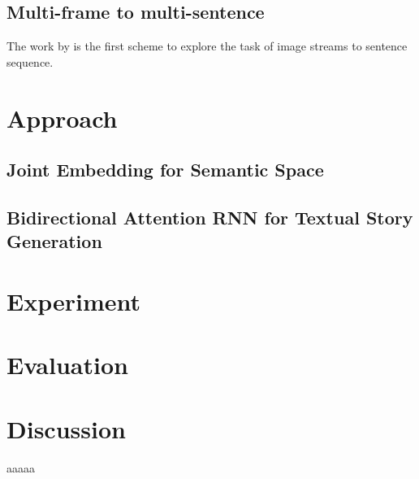 \documentclass[11pt]{article}
\begin{document}
		
		\subsection{Multi-frame to multi-sentence}
		The work by is the first scheme to explore the task of image streams to sentence sequence.		
		
		
	\section{Approach}
		\subsection{Joint Embedding for Semantic Space}
		
		\subsection{Bidirectional Attention RNN for Textual Story Generation}
		
	\section{Experiment}
	

	\section{Evaluation}


	\section{Discussion}
		aaaaa \cite{Chandra:81}

	
	
\end{document}
